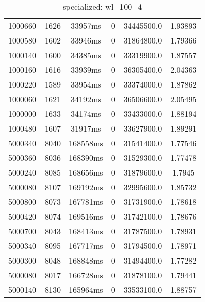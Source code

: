 \documentclass[./main.tex]{subfiles}
\begin{document}
\begin{table}
\begin{tabular}{ c | c | c | c | c | c }
        1000660 & 1626 & 33957ms & 0 & 34445500.0 & 1.93893 \\
        1000580 & 1602 & 33946ms & 0 & 31864800.0 & 1.79366 \\
        1000140 & 1600 & 34385ms & 0 & 33319900.0 & 1.87557 \\
        1000160 & 1616 & 33939ms & 0 & 36305400.0 & 2.04363 \\
        1000220 & 1589 & 33954ms & 0 & 33374000.0 & 1.87862 \\
        1000060 & 1621 & 34192ms & 0 & 36506600.0 & 2.05495 \\
        1000000 & 1633 & 34174ms & 0 & 33433000.0 & 1.88194 \\
        \rowcolor{lightgray} 1000480 & 1607 & 31917ms & 0 & 33627900.0 & 1.89291 \\
        \hline
        5000340 & 8040 & 168558ms & 0 & 31541400.0 & 1.77546 \\
        5000360 & 8036 & 168390ms & 0 & 31529300.0 & 1.77478 \\
        5000240 & 8085 & 168656ms & 0 & 31879600.0 & 1.7945 \\
        5000080 & 8107 & 169192ms & 0 & 32995600.0 & 1.85732 \\
        5000800 & 8073 & 167781ms & 0 & 31731900.0 & 1.78618 \\
        5000420 & 8074 & 169516ms & 0 & 31742100.0 & 1.78676 \\
        \rowcolor{lightgray} 5000700 & 8043 & 168413ms & 0 & 31787500.0 & 1.78931 \\
        5000340 & 8095 & 167717ms & 0 & 31794500.0 & 1.78971 \\
        5000300 & 8048 & 168848ms & 0 & 31494400.0 & 1.77282 \\
        5000080 & 8017 & 166728ms & 0 & 31878100.0 & 1.79441 \\
        5000140 & 8130 & 165964ms & 0 & 33533100.0 & 1.88757 \\
    \end{tabular}
    \caption{specialized: wl\_100\_4}
\end{table}
\end{document}
